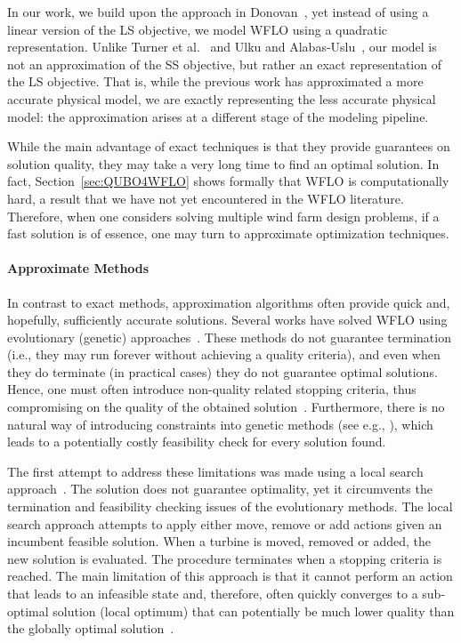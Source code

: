 \documentclass[preprint,12pt]{elsarticle}
\begin{document}
In our work, we build upon the approach in Donovan~\cite{donovan2005wind}, yet instead of using a linear version of the LS objective, we 
model WFLO using a quadratic representation. %
Unlike Turner et al.\ \cite{turner2014new} and Ulku and Alabas-Uslu\ \cite{ulku2019new}, our model is not an approximation of the SS objective, 
but rather an exact representation of the LS objective. That is, while the previous work has approximated a more accurate physical model, we are exactly representing the less accurate physical model: the approximation arises at a different stage of the modeling pipeline.

While the main advantage of exact techniques
is that they provide guarantees on solution quality, they may take a very long time to  find an optimal solution. 
In fact, Section~\ref{sec:QUBO4WFLO} shows formally that WFLO is computationally hard, a result
that we have not yet encountered in the WFLO literature. Therefore,
when one considers solving multiple wind farm design problems, if a fast solution is of essence,
one may turn to approximate optimization techniques.

\paragraph{Approximate Methods} In contrast to exact methods, approximation algorithms often provide   
quick and, hopefully, sufficiently accurate solutions. Several works have solved 
WFLO using evolutionary (genetic) approaches~\cite{MOSETTI1994105,gonzalez2010optimization,grady2005placement}. 
These methods do not guarantee termination 
(i.e., they may run forever without achieving a quality criteria), and even when they do terminate (in practical cases) they do
not guarantee optimal solutions. Hence, one must often
introduce non-quality related stopping criteria, 
thus compromising on the quality of the obtained solution~\cite{davis1991handbook}.
Furthermore, there is no natural way of introducing constraints into genetic methods (see e.g., \cite{sorkhabi2018constrained}), which
leads to a potentially costly feasibility check for every solution found. 

The first attempt to address these limitations 
was made using a local search approach~\cite{ozturk2004heuristic}. 
The solution does not guarantee optimality, 
yet it circumvents the termination and feasibility checking issues of the evolutionary
methods. The local search approach attempts to apply either move, remove or add actions given an incumbent 
feasible solution. When a turbine is moved, removed or added, the new solution is evaluated. The procedure terminates 
when a stopping criteria is reached.
The main limitation of this approach 
is that it cannot perform an action 
that leads to an infeasible state and, therefore, often quickly converges to a sub-optimal solution (local optimum) 
that can potentially be much lower quality than the globally optimal solution~\cite{rivas2009solving}. 
\end{document}
